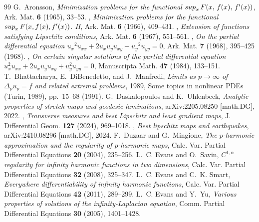 \documentclass[10pt,a4paper]{amsart}
\begin{document}
\begin{thebibliography}{99}
 G.~Aronsson, \emph{Minimization problems for the functional {${\rm sup}_{x}\,F(x,\,f(x),\,f^{\prime} (x))$}}, Ark. Mat. \textbf{6} (1965), 33--53.
 \bysame, \emph{Minimization problems for the functional {${\rm sup}_{x}\, F(x, f(x),f\sp\prime (x))$}. {II}}, Ark. Mat. \textbf{6} (1966), 409--431.
 \bysame, \emph{Extension of functions satisfying {L}ipschitz conditions}, Ark. Mat. \textbf{6} (1967), 551--561.
 \bysame, \emph{On the partial differential equation {$u_{x}{}^{2}\!u_{xx}+2u_{x}u_{y}u_{xy}+u_{y}{}^{2}\!u_{yy}=0$}}, Ark. Mat. \textbf{7} (1968), 395--425 (1968).
 \bysame, \emph{On certain singular solutions of the partial differential equation {$u^{2}_{x}u_{xx}+2u_{x}u_{y}u_{xy}+u^{2}_{y}u_{yy}=0$}}, Manuscripta Math. \textbf{47} (1984), 133--151.
 T.~Bhattacharya, E.~DiBenedetto, and J.~Manfredi, \emph{Limits as {$p\to\infty$} of {$\Delta_pu_p=f$} and related extremal problems}, 1989, Some topics in nonlinear PDEs (Turin, 1989), pp.~15--68 (1991).
 G.~Daskalopoulos and K.~Uhlenbeck, \emph{Analytic properties of stretch maps and geodesic laminations}, arXiv:2205.08250 [math.DG], 2022.
 \bysame, \emph{Transverse measures and best {L}ipschitz and least gradient maps}, J. Differential Geom. \textbf{127} (2024), 969--1018.
 \bysame, \emph{Best lipschitz maps and earthquakes}, arXiv:2410.08296 [math.DG], 2024.
 F.~Duzaar and G.~Mingione, \emph{The {$p$}-harmonic approximation and the regularity of {$p$}-harmonic maps}, Calc. Var. Partial Differential Equations \textbf{20} (2004), 235--256.
 L.~C. Evans and O.~Savin, \emph{{$C^{1,\alpha}$} regularity for infinity harmonic functions in two dimensions}, Calc. Var. Partial Differential Equations \textbf{32} (2008), 325--347.
 L.~C. Evans and C.~K. Smart, \emph{Everywhere differentiability of infinity harmonic functions}, Calc. Var. Partial Differential Equations \textbf{42} (2011), 289--299.
 L.~C. Evans and Y.~Yu, \emph{Various properties of solutions of the infinity-{L}aplacian equation}, Comm. Partial Differential Equations \textbf{30} (2005), 1401--1428.

\end{thebibliography}
\end{document}
